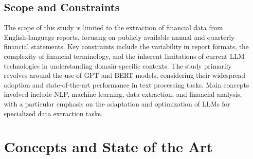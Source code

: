 \documentclass[english, 12pt, a4paper, elec, utf8, a-2b, online]{aaltothesis}
\begin{document}
\subsection{Scope and Constraints}

The scope of this study is limited to the extraction of financial data from English-language reports, focusing on publicly available annual and quarterly financial statements. Key constraints include the variability in report formats, the complexity of financial terminology, and the inherent limitations of current LLM technologies in understanding domain-specific contexts. The study primarily revolves around the use of GPT and BERT models, considering their widespread adoption and state-of-the-art performance in text processing tasks. Main concepts involved include \ac{NLP}, machine learning, data extraction, and financial analysis, with a particular emphasis on the adaptation and optimization of LLMs for specialized data extraction tasks.

\clearpage
\section{Concepts and State of the Art}
\end{document}
